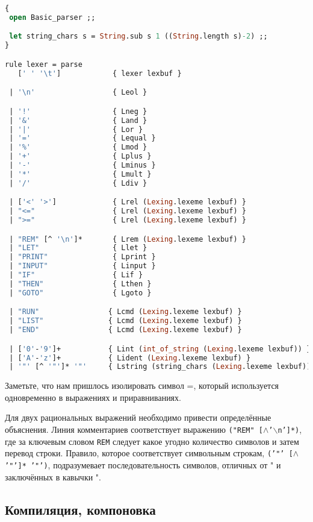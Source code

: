 \begin{lstlisting}[language=OCaml]
{
 open Basic_parser ;;

 let string_chars s = String.sub s 1 ((String.length s)-2) ;;
}

rule lexer = parse
   [' ' '\t']            { lexer lexbuf }

 | '\n'                  { Leol }

 | '!'                   { Lneg }
 | '&'                   { Land }
 | '|'                   { Lor }
 | '='                   { Lequal }
 | '%'                   { Lmod }
 | '+'                   { Lplus }
 | '-'                   { Lminus }
 | '*'                   { Lmult }
 | '/'                   { Ldiv }

 | ['<' '>']             { Lrel (Lexing.lexeme lexbuf) }
 | "<="                  { Lrel (Lexing.lexeme lexbuf) }
 | ">="                  { Lrel (Lexing.lexeme lexbuf) }

 | "REM" [^ '\n']*       { Lrem (Lexing.lexeme lexbuf) }
 | "LET"                 { Llet }
 | "PRINT"               { Lprint }
 | "INPUT"               { Linput }
 | "IF"                  { Lif }
 | "THEN"                { Lthen }
 | "GOTO"                { Lgoto }

 | "RUN"                { Lcmd (Lexing.lexeme lexbuf) }
 | "LIST"               { Lcmd (Lexing.lexeme lexbuf) }
 | "END"                { Lcmd (Lexing.lexeme lexbuf) }

 | ['0'-'9']+           { Lint (int_of_string (Lexing.lexeme lexbuf)) }
 | ['A'-'z']+           { Lident (Lexing.lexeme lexbuf) }
 | '"' [^ '"']* '"'     { Lstring (string_chars (Lexing.lexeme lexbuf)) }
\end{lstlisting}

Заметьте, что нам пришлось изолировать символ =, который используется
одновременно в выражениях и приравниваниях.

Для двух рациональных выражений необходимо привести определённые объяснения.
Линия комментариев соответствует выражению \texttt{("REM"
[$\wedge$'$\backslash$n']*)}, где за ключевым словом \texttt{REM} следует какое
угодно количество символов и затем перевод строки. Правило, которое
соответствует символьным строкам, \texttt{('"' [$\wedge$ '"']* '"')},
подразумевает последовательность символов, отличных от " и заключённых в
кавычки ".

\subsection{Компиляция, компоновка}

